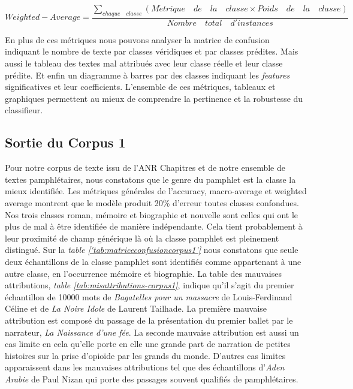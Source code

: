 \begin{equation}
Weighted-Average = \frac{\sum_{chaque\quad classe} (M\acute{e}trique\quad de\quad la\quad classe \times Poids\quad de\quad la\quad classe)}{Nombre\quad total\quad d'instances}
\end{equation}

En plus de ces métriques nous pouvons analyser la matrice de confusion indiquant le nombre de texte par classes véridiques et par classes prédites. Mais aussi le tableau des textes mal attribués avec leur classe réelle et leur classe prédite. Et enfin un diagramme à barres par des classes indiquant les \textit{features} significatives et leur coefficients. L'ensemble de ces métriques, tableaux et graphiques permettent au mieux de comprendre la pertinence et la robustesse du classifieur.

\subsection{Sortie du Corpus 1}
Pour notre corpus de texte issu de l'ANR Chapitres et de notre ensemble de textes pamphlétaires, nous constatons que le genre du pamphlet est la classe la mieux identifiée. Les métriques générales de l'accuracy, macro-average et weighted average montrent que le modèle produit 20\% d'erreur toutes classes confondues. Nos trois classes roman, mémoire et biographie et nouvelle sont celles qui ont le plus de mal à être identifiée de manière indépendante. Cela tient probablement à leur proximité de champ générique là où la classe pamphlet est pleinement distingué. Sur la \textit{table \ref{'tab:matriceconfusioncorpus1'}} nous constatons que seule deux échantillons de la classe pamphlet sont identifiés comme appartenant à une autre classe, en l'occurrence mémoire et biographie. La table des mauvaises attributions, \textit{table \ref{tab:misattributions-corpus1}}, indique qu'il s'agit du premier échantillon de 10000 mots de \textit{Bagatelles pour un massacre} de Louis-Ferdinand Céline et de \textit{La Noire Idole} de Laurent Tailhade. La première mauvaise attribution est composé du passage de la présentation du premier ballet par le narrateur, \textit{La Naissance d'une fée}. La seconde mauvaise attribution est aussi un cas limite en cela qu'elle porte en elle une grande part de narration de petites histoires sur la prise d'opioïde par les grands du monde. 
D'autres cas limites apparaissent dans les mauvaises attributions tel que des échantillons d'\textit{Aden Arabie} de Paul Nizan qui porte des passages souvent qualifiés de pamphlétaires.


